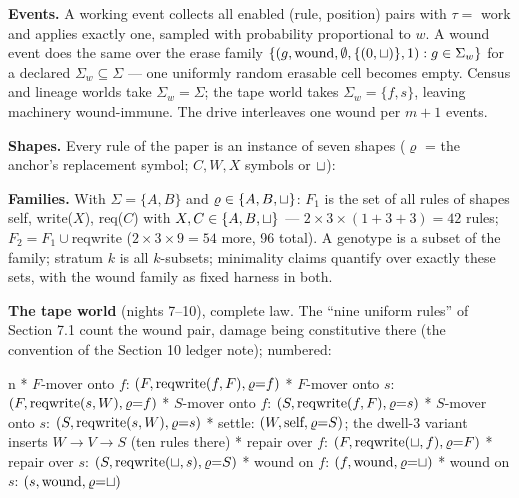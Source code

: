 {\bf Events.} A working event collects all enabled
(rule, position) pairs with $\tau=$ work and applies exactly one,
sampled with probability proportional to $w$. A wound event does the same over the
erase family $\{(g,\hbox{wound},\emptyset,\{(0,\sqcup)\},1):
g\in\Sigma_w\}$ for a declared $\Sigma_w\subseteq\Sigma$ ---
one uniformly random erasable cell becomes empty. Census and
lineage worlds take $\Sigma_w=\Sigma$; the tape world takes
$\Sigma_w=\{f,s\}$, leaving machinery wound-immune. The drive interleaves one wound per $m{+}1$
events.

{\bf Shapes.} Every rule of the paper is an instance of seven
shapes ($\varrho$ = the anchor's replacement symbol; $C,W,X$
symbols or $\sqcup$):

\medskip
\noindent{}
\medskip

{\bf Families.} With $\Sigma=\{A,B\}$ and
$\varrho\in\{A,B,\sqcup\}$: $F_1$ is the set of all rules of
shapes self, write($X$), req($C$) with $X,C\in\{A,B,\sqcup\}$ ---
$2\times3\times(1{+}3{+}3)=42$ rules; $F_2=F_1\cup{}$reqwrite
($2\times3\times9=54$ more, 96 total). A genotype is a subset of
the family; stratum $k$ is all $k$-subsets; minimality claims
quantify over exactly these sets, with the wound family as fixed
harness in both.

{\bf The tape world} (nights 7--10), complete law. The
“nine uniform rules” of Section 7.1 count the wound pair, damage
being constitutive there (the convention of the Section 10 ledger
note); numbered:

\begitems\style n
* $F$-mover onto $f$: $(F,\hbox{reqwrite}(f,F),\varrho{=}f)$
* $F$-mover onto $s$: $(F,\hbox{reqwrite}(s,W),\varrho{=}f)$
* $S$-mover onto $f$: $(S,\hbox{reqwrite}(f,F),\varrho{=}s)$
* $S$-mover onto $s$: $(S,\hbox{reqwrite}(s,W),\varrho{=}s)$
* settle: $(W,\hbox{self},\varrho{=}S)$; the dwell-3 variant
inserts $W{\to}V{\to}S$ (ten rules there)
* repair over $f$: $(F,\hbox{reqwrite}(\sqcup,f),\varrho{=}F)$
* repair over $s$: $(S,\hbox{reqwrite}(\sqcup,s),\varrho{=}S)$
* wound on $f$: $(f,\hbox{wound},\varrho{=}\sqcup)$
* wound on $s$: $(s,\hbox{wound},\varrho{=}\sqcup)$
\enditems

